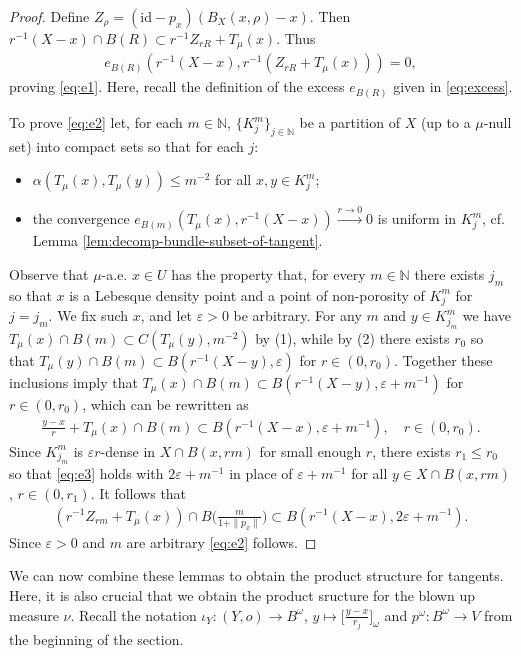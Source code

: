 \documentclass{amsart}
\numberwithin{equation}{section}
\newcommand{\N}{\mathbb{N}}
\newcommand{\id}{\mathrm {id}}
\newcommand{\inv}{^{-1}}
\begin{document}
\begin{proof}
Define $Z_\rho=(\id-p_x)(B_X(x,\rho)-x)$. Then $r\inv(X-x)\cap B(R)\subset r\inv Z_{rR}+T_\mu (x)$. Thus 
\begin{align*}
    e_{B(R)}(r\inv(X-x),r\inv(Z_{rR}+T_\mu (x)))=0,
\end{align*}
proving \eqref{eq:e1}. Here, recall the definition of the excess $e_{B(R)}$ given in \eqref{eq:excess}.

To prove \eqref{eq:e2} let, for each $m\in \N$, $\{K_j^m\}_{j\in \N}$ be a partition of $X$ (up to a $\mu$-null set) into compact sets so that for each $j$:
\begin{itemize}
    \item[(1)] $\alpha(T_\mu(x),T_\mu(y))\le m^{-2}$ for all $x,y\in K_j^m$;
    \item[(2)] the convergence $e_{B(m)}(T_\mu(x),r\inv(X-x))\stackrel{r\to 0}{\longrightarrow} 0$ is uniform in $K^m_j$, cf. Lemma \ref{lem:decomp-bundle-subset-of-tangent}.
\end{itemize}

Observe that $\mu$-a.e. $x\in U$ has the property that, for every $m\in\N$ there exists $j_m$ so that $x$ is a Lebesque density point and a point of non-porosity of $K_j^m$ for $j=j_m$. We fix such $x$, and let $\varepsilon>0$ be arbitrary. For any $m$ and $y\in K^m_{j_m}$ we have $T_\mu(x)\cap B(m)\subset C(T_\mu(y),m^{-2})$ by (1), while by (2) there exists $r_0$ so that $T_\mu(y)\cap B(m)\subset B(r\inv(X-y),\varepsilon)$ for $r\in (0,r_0)$. Together these inclusions imply that $T_\mu(x)\cap B(m)\subset B(r\inv(X-y),\varepsilon+m\inv)$ for $r\in (0,r_0)$, which can be rewritten as
\begin{align}\label{eq:e3}
    \frac{y-x}{r}+T_\mu(x)\cap B(m)\subset B(r\inv(X-x),\varepsilon+m\inv),\quad r\in (0,r_0).
\end{align}
Since $K_{j_m}^m$ is $\varepsilon r$-dense in $X\cap B(x,rm)$ for small enough $r$, there exists $r_1\le r_0$ so that \eqref{eq:e3} holds with $2\varepsilon+m\inv$ in place of $\varepsilon+m\inv$ for all $y\in X \cap B(x,rm)$, $r\in (0,r_1)$. It follows that 
\begin{align*}
    (r\inv Z_{rm}+T_\mu(x))\cap B\Big(\frac{m}{1+\|p_x\|}\Big)\subset B(r\inv(X-x),2\varepsilon+m\inv).
\end{align*}
Since $\varepsilon>0$ and $m$ are arbitrary \eqref{eq:e2} follows.
\end{proof}

We can now combine these lemmas to obtain the product structure for tangents. Here, it is also crucial that we obtain the product sructure for the blown up measure $\nu$. Recall the notation $\iota_Y:(Y,o)\to B^\omega$, $y\mapsto \Big[\frac{y-x}{r_j}\Big]_\omega$ and $p^\omega:B^\omega\to V$ from the beginning of the section.
\end{document}
